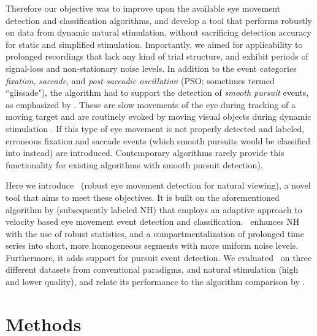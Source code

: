 Therefore our objective was to improve upon the available eye movement
detection and classification algorithms, and develop a tool that performs
robustly on data from dynamic natural stimulation, without sacrificing detection
accuracy for static and simplified stimulation. Importantly, we aimed for
applicability to prolonged recordings that lack any kind of trial structure,
and exhibit periods of signal-loss and non-stationary noise levels.
In addition to the event categories \textit{fixation}, \textit{saccade}, and
\textit{post-saccadic oscillation} (PSO; sometimes termed ``glissade"), the
algorithm had to support the detection of \textit{smooth pursuit} events, as
emphasized by \cite{Andersson2017}.  These are slow movements of the eye during
tracking of a moving target and are routinely evoked by moving visual objects
during dynamic stimulation \citep{carl1987pursuits}.  If this type of eye
movement is not properly detected and labeled, erroneous fixation and saccade
events (which smooth pursuits would be classified into instead) are introduced.
Contemporary algorithms rarely provide this functionality
\cite[but see \eg][]{LARSSON2015145,Komogortsev2013} for existing algorithms with
smooth pursuit detection).

Here we introduce \remodnav\ (robust eye movement detection for natural
viewing), a novel tool that aims to meet these objectives. It is built on the
aforementioned algorithm by \citet{Nystrom2010AnData} (subsequently labeled NH)
that employs an adaptive approach to velocity based eye movement event
detection and classification. \remodnav\ enhances NH with the use of robust
statistics, and a compartmentalization of prolonged time series into short,
more homogeneous segments with more uniform noise levels. Furthermore, it adds
support for pursuit event detection. We evaluated \remodnav\ on three different
datasets from conventional paradigms, and natural stimulation (high and lower
quality), and relate its performance to the algorithm comparison by
\cite{Andersson2017}.


\section*{Methods}\label{methods}




